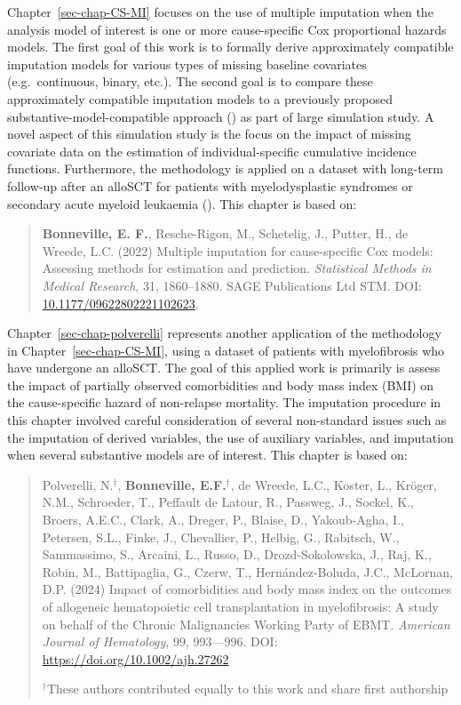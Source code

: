 \documentclass[
  letterpaper,
  paper=240mm:170mm,
  twoside=true,
  open=right,
  fontsize=10pt,
  pagesize=false,
  BCOR=15mm,
  DIV=14,
  headinclude=true,
  footinclude=false,
  headsepline=on]{scrbook}
\begin{document}
Chapter~\ref{sec-chap-CS-MI} focuses on the use of multiple imputation
when the analysis model of interest is one or more cause-specific Cox
proportional hazards models. The first goal of this work is to formally
derive approximately compatible imputation models for various types of
missing baseline covariates (e.g.~continuous, binary, etc.). The second
goal is to compare these approximately compatible imputation models to a
previously proposed substantive-model-compatible approach
() as part of large simulation study. A novel aspect of this
simulation study is the focus on the impact of missing covariate data on
the estimation of individual-specific cumulative incidence functions.
Furthermore, the methodology is applied on a dataset with long-term
follow-up after an alloSCT for patients with myelodysplastic syndromes
or secondary acute myeloid leukaemia
(). This chapter is based on:

\begin{quote}
\textbf{Bonneville, E. F.}, Resche-Rigon, M., Schetelig, J., Putter, H.,
de Wreede, L.C. (2022) Multiple imputation for cause-specific Cox
models: Assessing methods for estimation and prediction.
\emph{Statistical Methods in Medical Research}, 31, 1860--1880. SAGE
Publications Ltd STM. DOI:
\href{https://doi.org/10.1177/09622802221102623}{10.1177/09622802221102623}.
\end{quote}

Chapter~\ref{sec-chap-polverelli} represents another application of the
methodology in Chapter~\ref{sec-chap-CS-MI}, using a dataset of patients
with myelofibrosis who have undergone an alloSCT. The goal of this
applied work is primarily is assess the impact of partially observed
comorbidities and body mass index (BMI) on the cause-specific hazard of
non-relapse mortality. The imputation procedure in this chapter involved
careful consideration of several non-standard issues such as the
imputation of derived variables, the use of auxiliary variables, and
imputation when several substantive models are of interest. This chapter
is based on:

\begin{quote}
Polverelli, N.\(^\dagger\), \textbf{Bonneville, E.F.}\(^\dagger\), de
Wreede, L.C., Koster, L., Kröger, N.M., Schroeder, T., Peffault de
Latour, R., Passweg, J., Sockel, K., Broers, A.E.C., Clark, A., Dreger,
P., Blaise, D., Yakoub-Agha, I., Petersen, S.L., Finke, J., Chevallier,
P., Helbig, G., Rabitsch, W., Sammassimo, S., Arcaini, L., Russo, D.,
Drozd-Sokolowska, J., Raj, K., Robin, M., Battipaglia, G., Czerw, T.,
Hernández-Boluda, J.C., McLornan, D.P. (2024) Impact of comorbidities
and body mass index on the outcomes of allogeneic hematopoietic cell
transplantation in myelofibrosis: A study on behalf of the Chronic
Malignancies Working Party of EBMT. \emph{American Journal of
Hematology}, 99, 993---996. DOI: \url{https://doi.org/10.1002/ajh.27262}

\(^\dagger\)These authors contributed equally to this work and share
first authorship
\end{quote}
\end{document}
